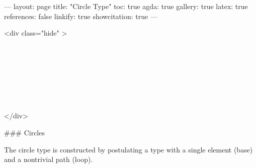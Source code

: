 ---
layout: page
title: "Circle Type"
toc: true
agda: true
gallery: true
latex: true
references: false
linkify: true
showcitation: true
---

<div class="hide" >
\begin{code}%
\>[0]\AgdaSymbol{\{-\#}\AgdaSpace{}%
\AgdaSpace{}%
\AgdaSpace{}%
\AgdaSymbol{\#-\}}\<%
\\
\>[0]\AgdaSpace{}%
\AgdaSpace{}%
\<%
\\
\>[0]\AgdaSpace{}%
\AgdaSpace{}%
\<%
\\
%
\\[\AgdaEmptyExtraSkip]%
\>[0]\AgdaSpace{}%
\AgdaSpace{}%
\<%
\\
\>[0]\AgdaSpace{}%
\AgdaSpace{}%
\<%
\\
\>[0]\AgdaSpace{}%
\AgdaSpace{}%
\<%
\end{code}
</div>

### Circles

The circle type is constructed by postulating a type with
a single element (base) and a nontrivial path (loop).

\begin{code}%
\>[0]\AgdaSpace{}%
\AgdaSpace{}%
\<%
\end{code}

\begin{code}%
\>[0][@{}l@{\AgdaIndent{1}}]%
\>[2]\<%
\\
\>[2][@{}l@{\AgdaIndent{0}}]%
\>[4]\AgdaSpace{}%
\AgdaSpace{}%
\AgdaSymbol{:}\AgdaSpace{}%
\AgdaSpace{}%
\<%
\\
\>[4][@{}l@{\AgdaIndent{0}}]%
\>[6]\AgdaSpace{}%
\AgdaSymbol{:}\AgdaSpace{}%
\<%
\\
%
\\[\AgdaEmptyExtraSkip]%
%
\>[2]\AgdaSpace{}%
\AgdaSymbol{:}\AgdaSpace{}%
\<%
\\
%
\>[2]\AgdaSpace{}%
\AgdaSymbol{=}\AgdaSpace{}%
\<%
\\
%
\\[\AgdaEmptyExtraSkip]%
%
\>[2]\AgdaSpace{}%
\AgdaSymbol{:}\AgdaSpace{}%
\<%
\\
%
\>[2]\AgdaSpace{}%
\AgdaSymbol{=}\AgdaSpace{}%
\<%
\\
%
\\[\AgdaEmptyExtraSkip]%
%
\>[2]\<%
\\
\>[2][@{}l@{\AgdaIndent{0}}]%
\>[4]\AgdaSpace{}%
\AgdaSymbol{:}\AgdaSpace{}%
\AgdaSpace{}%
\AgdaOperator{\AgdaDatatype{==}}\AgdaSpace{}%
\<%
\end{code}

